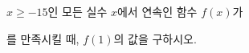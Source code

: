 $x\ge -15$인 모든 실수 $x$에서 연속인 함수 $f(x)$가 \par\smallskip{}\par\smallskip\noindent 를 만족시킬 때, $f(1)$의 값을 구하시오.
